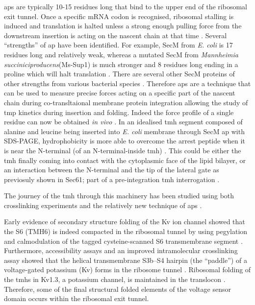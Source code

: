 \gls{ap}s are typically 10-15 residues long that bind to the upper end of the ribosomal exit tunnel.
Once a specific mRNA codon is recognised, ribosomal stalling is induced \cite{Ito2010} and translation is halted unless a strong enough pulling force from the downstream insertion is acting on the nascent chain at that time \cite{Butkus2003}.
Several ``strengths'' of \gls{ap} have been identified.
For example, SecM from \textit{E. coli} is 17 residues long and relatively weak, whereas a mutated SecM from \textit{Mannheimia succiniciproducens}(Ms-Sup1) is much stronger and 8 residues long ending in a proline which will halt translation \cite{Ismail2012}.
There are several other SecM proteins of other strengths from various bacterial species \cite{Yap2009}.
Therefore \gls{ap}s are a technique that can be used to measure precise forces acting on a specific part of the nascent chain during co-transltaional membrane protein integration allowing the study of \gls{tmp} kinetics during insertion and folding.
Indeed the force profile of a single residue can now be obtained \textit{in vivo} \cite{Ismail2012}.
In an idealised \gls{tmh} segment composed of alanine and leucine being inserted into \textit{E. coli} membrane through SecM \gls{ap} with SDS-PAGE, hydrophobicity is more able to overcome the arrest peptide when it is near the N-terminal (of an N-terminal-inside \gls{tmh}) \cite{Ismail2012}.
This could be either the \gls{tmh} finally coming into contact with the cytoplasmic face of the lipid bilayer, or an interaction between the N-terminal and the tip of the lateral gate as previosuly shown in Sec61; part of a pre-integration \gls{tmh} interrogation \cite{MacKinnon2014}.

The journey of the \gls{tmh} through this machinery has been studied using both crosslinking experiments and the relatively new technique of \gls{ap}s \cite{Cymer2015}.

Early evidence of secondary structure folding of the Kv ion channel showed that the S6 (TMH6) is indeed compacted in the ribosomal tunnel by using pegylation and calmodulation of the tagged cysteine-scanned S6 transmembrane segment \cite{Lu2005}.
Furthermore, accessibility assays and an improved intramolecular crosslinking assay showed that the helical transmembrane S3b–S4 hairpin (the “paddle”) of a voltage-gated potassium (Kv) forms in the ribosome tunnel \cite{Tu2014}.
Ribosomal folding of the \gls{tmh}s in Kv1.3, a potassium channel, is maintained in the translocon \cite{Tu2010a}.
Therefore, some of the final structural folded elements of the voltage sensor domain occurs within the ribosomal exit tunnel.

